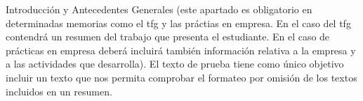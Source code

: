 \indent Introducci\'on y Antecedentes Generales (este apartado es obligatorio en determinadas memorias como el tfg y las práctias en empresa. En el caso del tfg contendrá un resumen del trabajo que presenta el estudiante. En el caso de prácticas en empresa deberá incluir\'a tambi\'en informaci\'on relativa a la empresa y a las
actividades que desarrolla). El texto de prueba tiene como \'unico
objetivo incluir un texto que nos permita comprobar el formateo por
omisi\'on de los textos incluidos en un resumen.
